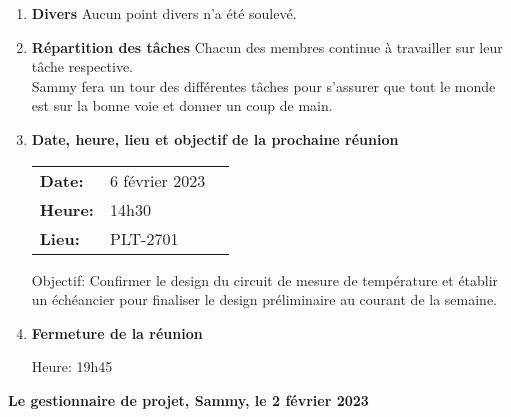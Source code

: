 \documentclass[12pt]{ULojpv}
\begin{document}
\begin{enumerate}
\begin{enumerate}
      
   \end{enumerate}

\item \textbf{Divers}
   Aucun point divers n'a été soulevé.

\item \textbf{Répartition des tâches}
   Chacun des membres continue à travailler sur leur tâche respective.\\
   Sammy fera un tour des différentes tâches pour s'assurer que tout le monde
   est sur la bonne voie et donner un coup de main.



\item \textbf{Date, heure, lieu et objectif de la prochaine réunion}

\begin{tabular}{@{}lll}
   \textbf{Date:} & 6 février 2023 & \\
   \textbf{Heure:} & 14h30 & \\
   \textbf{Lieu:} & PLT-2701 & \\
\end{tabular}
\par

Objectif: Confirmer le design du circuit de mesure de température 
            et établir un échéancier pour finaliser le design préliminaire au courant de la semaine.


\item \textbf{Fermeture de la réunion}

Heure: 19h45




\end{enumerate}

\begin{flushright}
   \textbf{Le gestionnaire de projet, Sammy, le 2 février 2023}

\end{flushright}
\end{document}
